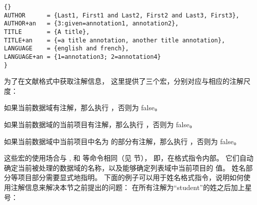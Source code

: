 \begin{lstlisting}[style=bibtex]{}
AUTHOR      = {Last1, First1 and Last2, First2 and Last3, First3},
AUTHOR+an   = {3:given=annotation1, annotation2},
TITLE       = {A title},
TITLE+an    = {=a title annotation, another title annotation},
LANGUAGE    = {english and french},
LANGUAGE+an = {1=annotation3; 2=annotation4}
}
\end{lstlisting}
%
为了在文献格式中获取注解信息，
这里提供了三个宏，分别对应与相应的注解尺度：

\begin{ltxsyntax}



如果当前数据域有注解，那么执行 ，否则为 false。



如果当前数据域的当前项目有注解，那么执行 ，否则为 false。



如果当前数据域中当前项目中名为  的部分有注解，那么执行 ，否则为 false。

\end{ltxsyntax}
%
这些宏的使用场合与 ,  和  等命令相同（见  节），
即，在格式指令内部。
它们自动确定当前被处理的数据域的名称，以及能够确定列表域中当前项目的  值。
姓名部分等项目部分需要显式地指明。
下面的例子可以用于姓名格式指令，说明如何使用注解信息来解决本节之前提出的问题：
在所有注解为“student”的姓之后加上星号：

